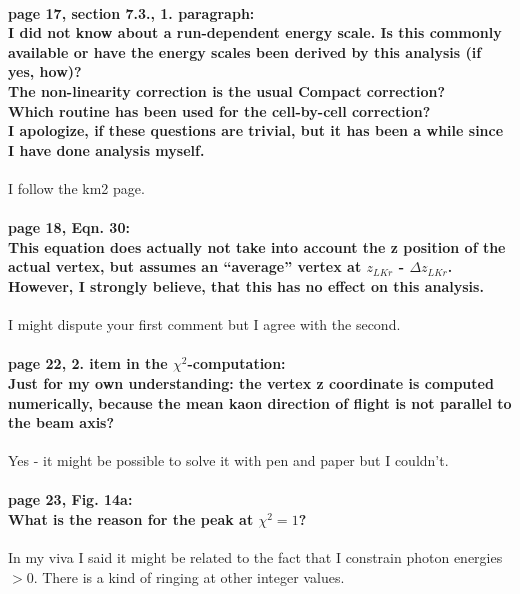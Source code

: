 \documentclass[12pt]{report}
\begin{document}
\paragraph{page 17, section 7.3., 1. paragraph: \\
    I did not know about a run-dependent energy scale. Is this commonly available or have the energy scales been derived by this analysis (if yes, how)? \\
    The non-linearity correction is the usual Compact correction?\\
    Which routine has been used for the cell-by-cell correction?\\
    I apologize, if these questions are trivial, but it has been a while since I have done analysis myself.\\
}

I follow the km2 page.

\paragraph{page 18, Eqn. 30:\\
    This equation does actually not take into account the z position of the actual vertex, but assumes an “average” vertex at $z_{LKr}$ - $\Delta z_{LKr}$. However, I strongly believe, that this has no effect on this analysis.
}

I might dispute your first comment but I agree with the second.


\paragraph{page 22, 2. item in the $\chi^2$-computation: \\
    Just for my own understanding: the vertex z coordinate is computed numerically, because the mean kaon direction of flight is not parallel to the beam axis?\\
}

Yes - it might be possible to solve it with pen and paper but I couldn’t.

\paragraph{page 23, Fig. 14a:\\
    What is the reason for the peak at $\chi^2 = 1$?\\
}
In my viva I said it might be related to the fact that I constrain photon energies $> 0$.
There is a kind of ringing at other integer values.
\end{document}
